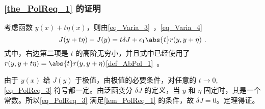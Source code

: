  \subsubsection{\autoref{the_PolReq_1} 的证明}
考虑函数 $y(x)+t\eta(x)$，则由\autoref{eq_Varia_3}~，\autoref{eq_Varia_4}~
\begin{equation}\label{eq_PolReq_3}
J(y+t\eta)-J(y)=t\delta J+\epsilon_1\abs{t}r(y,y+\eta)~.
\end{equation}
式中，右边第二项是 $t$ 的高阶无穷小，并且式中已经使用了 $r(y,y+t\eta)=\abs{t}r(y,y+\eta)$\autoref{def_AbPol_1}~。

由于 $y(x)$ 给 $J(y)$ 于极值，由极值的必要条件，对任意的 $t\rightarrow0$, \autoref{eq_PolReq_3} 符号都一定。由泛函变分 $\delta J$ 的定义，当 $y$ 和 $\eta$ 固定时，其是一个常数。所以\autoref{eq_PolReq_3} 满足\autoref{lem_PolReq_1} 的条件，故 $\delta J=0$。定理得证。